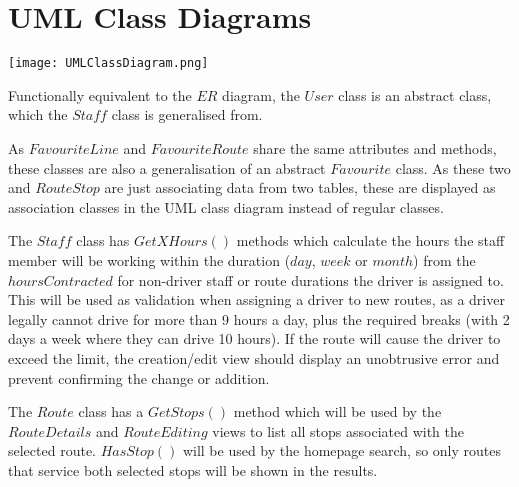 \clearpage
\section{UML Class Diagrams}

\texttt{[image: UMLClassDiagram.png]}

\medskip

Functionally equivalent to the $ER$ diagram, the $User$ class is an
abstract class, which the $Staff$ class is generalised from.

\medskip

As $FavouriteLine$ and $FavouriteRoute$ share the same attributes
and methods, these classes are also a generalisation of an abstract
$Favourite$ class. As these two and $RouteStop$ are just associating
data from two tables, these are displayed as association classes in
the UML class diagram instead of regular classes.

\medskip

The $Staff$ class has $GetXHours()$ methods which calculate the hours
the staff member will be working within the duration ($day$, $week$ or
$month$) from the $hoursContracted$ for non-driver staff or route
durations the driver is assigned to. This will be used as validation
when assigning a driver to new routes, as a driver legally cannot
drive for more than 9 hours a day, plus the required breaks (with 2
days a week where they can drive 10 hours). If the route will cause
the driver to exceed the limit, the creation/edit view should
display an unobtrusive error and prevent confirming the change or
addition.

\medskip

The $Route$ class has a $GetStops()$ method which will be used by
the $Route Details$ and $Route Editing$ views to list all stops
associated with the selected route. $HasStop()$ will be used by the
homepage search, so only routes that service both selected stops
will be shown in the results.
